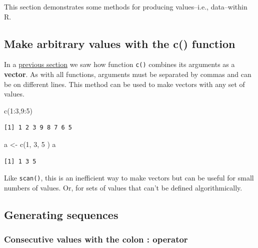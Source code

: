 \documentclass[
  13,
  letterpaper,
]{report}
\newenvironment{Shaded}{\begin{snugshade}}{\end{snugshade}}
\newcommand{\DecValTok}[1]{\textcolor[rgb]{0.68,0.00,0.00}{#1}}
\newcommand{\FunctionTok}[1]{\textcolor[rgb]{0.28,0.35,0.67}{#1}}
\newcommand{\NormalTok}[1]{\textcolor[rgb]{0.00,0.23,0.31}{#1}}
\newcommand{\OtherTok}[1]{\textcolor[rgb]{0.00,0.23,0.31}{#1}}
\newcommand{\SpecialCharTok}[1]{\textcolor[rgb]{0.37,0.37,0.37}{#1}}
\begin{document}
This section demonstrates some methods for producing values--i.e.,
data--within R.

\subsection{Make arbitrary values with the c()
function}\label{sec-05-make-c}

In a \hyperref[mod-03-c]{previous section} we saw how function
\texttt{c()} combines its arguments as a \textbf{vector}. As with all
functions, arguments must be separated by commas and can be on different
lines. This method can be used to make vectors with any set of values.

\begin{Shaded}
\begin{Highlighting}[]
\FunctionTok{c}\NormalTok{(}\DecValTok{1}\SpecialCharTok{:}\DecValTok{3}\NormalTok{,}\DecValTok{9}\SpecialCharTok{:}\DecValTok{5}\NormalTok{)}
\end{Highlighting}
\end{Shaded}

\begin{verbatim}
[1] 1 2 3 9 8 7 6 5
\end{verbatim}

\begin{Shaded}
\begin{Highlighting}[]
\NormalTok{a }\OtherTok{\textless{}{-}} \FunctionTok{c}\NormalTok{(}\DecValTok{1}\NormalTok{,}
      \DecValTok{3}\NormalTok{,}
       \DecValTok{5}
\NormalTok{       )}
\NormalTok{a}
\end{Highlighting}
\end{Shaded}

\begin{verbatim}
[1] 1 3 5
\end{verbatim}

Like \texttt{scan()}, this is an inefficient way to make vectors but can
be useful for small numbers of values. Or, for sets of values that can't
be defined algorithmically.

\subsection{Generating sequences}\label{sec-05-make-seq}

\subsubsection{Consecutive values with the colon :
operator}\label{sec-05-make-seq-col}
\end{document}
